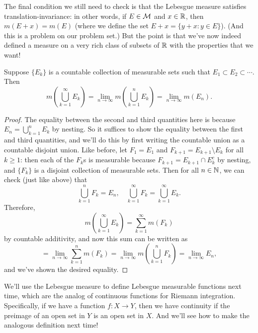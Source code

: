 The final condition we still need to check is that the Lebesgue measure satisfies translation-invariance: in other words, if $E \in \mathcal{M}$ and $x \in \mathbb R$, then $m(E+x) = m(E)$ (where we define the set $E+x = \{y+x: y \in E\}$). (And this is a problem on our problem set.) But the point is that we've now indeed defined a measure on a very rich class of subsets of $\mathbb R$ with the properties that we want!

\begin{theorem}
Suppose $\{E_k\}$ is a countable collection of measurable sets such that $E_1 \subset E_2 \subset \cdots$. Then
\[
    m\left(\bigcup_{k=1}^{\infty} E_k\right) = \lim_{n \to \infty} m\left(\bigcup_{k=1}^{n} E_k\right) = \lim_{n \to \infty} m(E_n).
\]
\end{theorem}
\begin{proof}
The equality between the second and third quantities here is because $E_n = \bigcup_{k=1}^n E_k$ by nesting. So it suffices to show the equality between the first and third quantities, and we'll do this by first writing the countable union as a countable disjoint union. Like before, let $F_1 = E_1$ and $F_{k+1} = E_{k+1} \setminus E_k$ for all $k \ge 1$: then each of the $F_k$s is measurable because $F_{k+1} = E_{k+1} \cap E_k^c$ by nesting, and $\{F_k\}$ is a disjoint collection of measurable sets. Then for all $n \in \mathbb N$, we can check (just like above) that
\[
    \bigcup_{k=1}^n F_k = E_n, \quad \bigcup_{k=1}^{\infty} F_k = \bigcup_{k=1}^{\infty} E_k. 
\]
Therefore, 
\[
    m\left(\bigcup_{k=1}^{\infty} E_k\right) = \sum_{k=1}^{\infty} m(F_k)
\]
by countable additivity, and now this sum can be written as 
\[
    = \lim_{n \to \infty} \sum_{k=1}^n m(F_k) = \lim_{n \to \infty} m\left(\bigcup_{k=1}^n F_k\right) = \lim_{n \to \infty} E_n,
\]
and we've shown the desired equality.
\end{proof}

We'll use the Lebesgue measure to define Lebesgue measurable functions next time, which are the analog of continuous functions for Riemann integration. Specifically, if we have a function $f: X \to Y$, then we have continuity if the preimage of an open set in $Y$ is an open set in $X$. And we'll see how to make the analogous definition next time! 